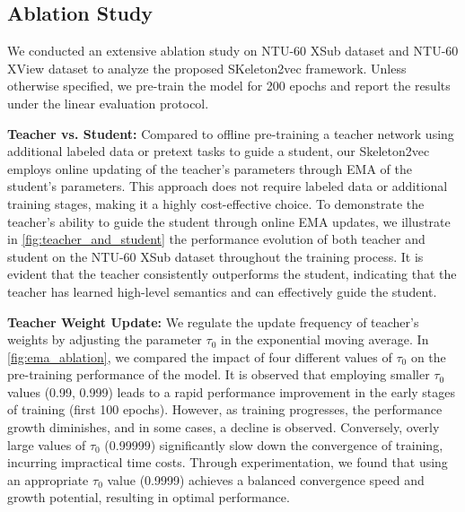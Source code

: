 \subsection{Ablation Study}
We conducted an extensive ablation study on NTU-60 XSub dataset and NTU-60 XView dataset to analyze the proposed
SKeleton2vec framework. Unless otherwise specified, we pre-train the model for 200
epochs and report the results under the linear evaluation protocol.

\noindent \textbf{Teacher vs. Student:}
Compared to offline pre-training a teacher network using additional labeled data or
pretext tasks to guide a student, our Skeleton2vec employs online updating of the
teacher's parameters through EMA of the student's parameters.
This approach does not require labeled data or additional training stages,
making it a highly cost-effective choice.
To demonstrate the teacher's ability to guide the student through online EMA updates,
we illustrate in \cref{fig:teacher_and_student} the performance evolution of both teacher and student on the
NTU-60 XSub dataset throughout the training process.
It is evident that the teacher consistently outperforms the student,
indicating that the teacher has learned high-level semantics and can effectively guide the student.

\noindent \textbf{Teacher Weight Update:}
We regulate the update frequency of teacher's weights by adjusting the parameter
$\tau_{0}$ in the exponential moving average. In \cref{fig:ema_ablation}, we compared the
impact of four different values of $\tau_{0}$ on the pre-training performance of the model.
It is observed that employing smaller $\tau_{0}$ values (0.99, 0.999) leads to a rapid
performance improvement in the early stages of training (first 100 epochs). However,
as training progresses, the performance growth diminishes, and in some cases,
a decline is observed. Conversely, overly large values of $\tau_{0}$ (0.99999) significantly
slow down the convergence of training, incurring impractical time costs.
Through experimentation, we found that using an appropriate $\tau_{0}$ value (0.9999)
achieves a balanced convergence speed and growth potential,
resulting in optimal performance.


